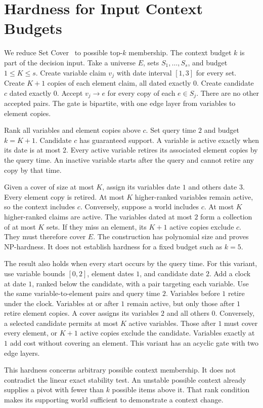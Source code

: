 \section{Hardness for Input Context Budgets}
\label{app:hardness}
We reduce Set Cover~\citep{karp1972reducibility} to possible top-$k$ membership.
The context budget $k$ is part of the decision input.
Take a universe $E$, sets $S_1,\ldots,S_s$, and budget $1\le K\le s$.
Create variable claim $v_j$ with date interval $[1,3]$ for every set.
Create $K+1$ copies of each element claim, all dated exactly $0$.
Create candidate $c$ dated exactly $0$.
Accept $v_j\to e$ for every copy of each $e\in S_j$.
There are no other accepted pairs.
The gate is bipartite, with one edge layer from variables to element copies.

Rank all variables and element copies above $c$.
Set query time $2$ and budget $k=K+1$.
Candidate $c$ has guaranteed support.
A variable is active exactly when its date is at most $2$.
Every active variable retires its associated element copies by the query time.
An inactive variable starts after the query and cannot retire any copy by that time.

Given a cover of size at most $K$, assign its variables date $1$ and others date $3$.
Every element copy is retired.
At most $K$ higher-ranked variables remain active, so the context includes $c$.
Conversely, suppose a world includes $c$.
At most $K$ higher-ranked claims are active.
The variables dated at most $2$ form a collection of at most $K$ sets.
If they miss an element, its $K+1$ active copies exclude $c$.
They must therefore cover $E$.
The construction has polynomial size and proves NP-hardness.
It does not establish hardness for a fixed budget such as $k=5$.

The result also holds when every start occurs by the query time.
For this variant, use variable bounds $[0,2]$, element dates $1$, and candidate date $2$.
Add a clock at date $1$, ranked below the candidate, with a pair targeting each variable.
Use the same variable-to-element pairs and query time $2$.
Variables before $1$ retire under the clock.
Variables at or after $1$ remain active, but only those after $1$ retire element copies.
A cover assigns its variables $2$ and all others $0$.
Conversely, a selected candidate permits at most $K$ active variables.
Those after $1$ must cover every element, or $K+1$ active copies exclude the candidate.
Variables exactly at $1$ add cost without covering an element.
This variant has an acyclic gate with two edge layers.

This hardness concerns arbitrary possible context membership.
It does not contradict the linear exact stability test.
An unstable possible context already supplies a pivot with fewer than $k$ possible items above it.
That rank condition makes its supporting world sufficient to demonstrate a context change.

